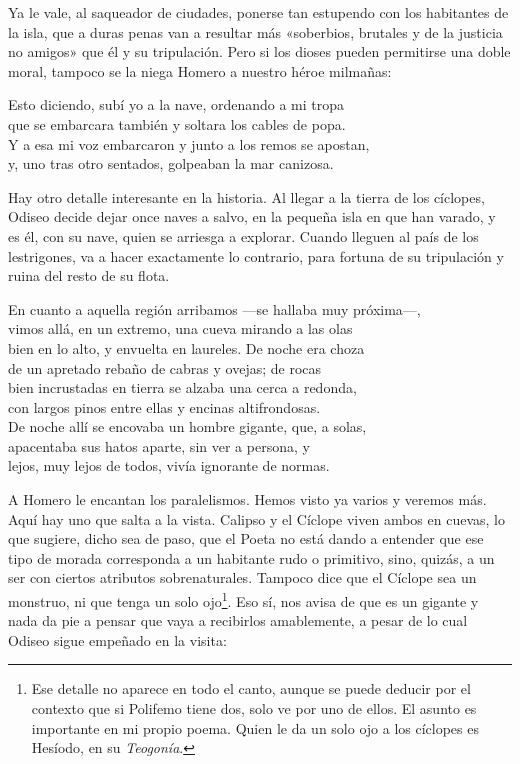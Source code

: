 Ya le vale, al saqueador de ciudades, ponerse tan estupendo con los habitantes de la isla, que a duras penas van a resultar más «soberbios, brutales y de la justicia no amigos» que él y su tripulación. Pero si los dioses pueden permitirse una doble moral, tampoco se la niega Homero a nuestro héroe milmañas:

\begin{versocita}
Esto diciendo, subí yo a la nave, ordenando a mi tropa\\
que se embarcara también y soltara los cables de popa.\\
Y a esa mi voz embarcaron y junto a los remos se apostan,\\
y, uno tras otro sentados, golpeaban la mar canizosa.
\end{versocita}

Hay otro detalle interesante en la historia. Al llegar a la tierra de los cíclopes, Odiseo decide dejar once naves a salvo, en la pequeña isla en que han varado, y es él, con su nave, quien se arriesga a explorar. Cuando lleguen al país de los lestrigones, va a hacer exactamente lo contrario, para fortuna de su tripulación y ruina del resto de su flota.

\begin{versocita}
En cuanto a aquella región arribamos ---se hallaba muy próxima---,\\
vimos allá, en un extremo, una cueva mirando a las olas\\
bien en lo alto, y envuelta en laureles. De noche era choza\\
de un apretado rebaño de cabras y ovejas; de rocas\\
bien incrustadas en tierra se alzaba una cerca a redonda,\\
con largos pinos entre ellas y encinas altifrondosas.\\
De noche allí se encovaba un hombre gigante, que, a solas,\\
apacentaba sus hatos aparte, sin ver a persona, y\\
lejos, muy lejos de todos, vivía ignorante de normas.
\end{versocita}

A Homero le encantan los paralelismos. Hemos visto ya varios y veremos más. Aquí hay uno que salta a la vista. Calipso y el Cíclope viven ambos en cuevas, lo que sugiere, dicho sea de paso, que el Poeta no está dando a entender que ese tipo de morada corresponda a un habitante rudo o primitivo, sino, quizás, a un ser con ciertos atributos sobrenaturales. Tampoco dice que el Cíclope sea un monstruo, ni que tenga un solo ojo\footnote{Ese detalle no aparece en todo el canto, aunque se puede deducir por el contexto que si Polifemo tiene dos, solo ve por uno de ellos. El asunto es importante en mi propio poema. Quien le da un solo ojo a los cíclopes es Hesíodo, en su \emph{Teogonía}.}. Eso sí, nos avisa de que es un gigante y nada da pie a pensar que vaya a recibirlos amablemente, a pesar de lo cual Odiseo sigue empeñado en la visita:

